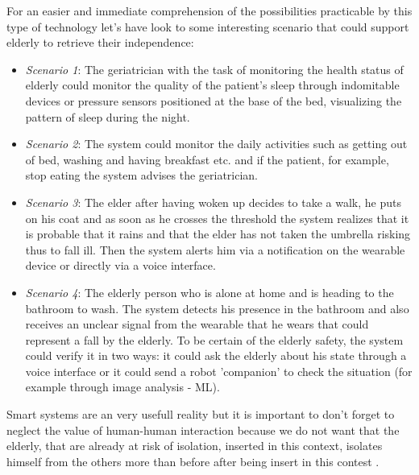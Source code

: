 \documentclass{thesisreport}
\begin{document}
 For an easier and immediate comprehension of the possibilities practicable by this type of technology let's have look to some interesting scenario that could support elderly to retrieve their independence:
 \begin{itemize}
     \item \textit{Scenario 1}: The geriatrician with the task of monitoring the health status of elderly could monitor the quality of the patient's sleep through indomitable devices or pressure sensors positioned at the base of the bed, visualizing the pattern of sleep during the night.
     \item \textit{Scenario 2}: The system could monitor the daily activities such as getting out of bed, washing and having breakfast etc. and if the patient, for example, stop eating the system advises the geriatrician.
     \item \textit{Scenario 3}: The elder after having woken up decides to take a walk, he puts on his coat and as soon as he crosses the threshold the system realizes that it is probable that it rains and that the elder has not taken the umbrella risking thus to fall ill. Then the system alerts him via a notification on the wearable device or directly via a voice interface.
     \item \textit{Scenario 4}: The elderly person who is alone at home  and is heading to the bathroom to wash. The system detects his presence in the bathroom and also receives an unclear signal from the wearable that he wears that could represent a fall by the elderly. To be certain of the elderly safety, the system could verify it  in two ways: it could ask the elderly about his state through a voice interface or it could send a robot 'companion' to check the situation (for example through image analysis - ML).
 \end{itemize}
 
 Smart systems are an very usefull reality but it is important to don't forget to neglect the value of human-human interaction because we do not want that the elderly, that are already at risk of isolation, inserted in this context, isolates himself from the others more than before after being insert in this contest \cite{phdthesis}.
 
\end{document}
